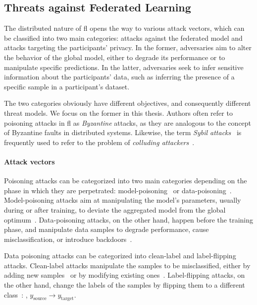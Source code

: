 \subsection{Threats against Federated Learning\label{sec:bg.fl.threats}}


The distributed nature of \gls{fl} opens the way to various attack vectors, which can be classified into two main categories: attacks against the federated model and attacks targeting the participants' privacy.
In the former, adversaries aim to alter the behavior of the global model, either to degrade its performance or to manipulate specific predictions.
In the latter, adversaries seek to infer sensitive information about the participants' data, such as inferring the presence of a specific sample in a participant's dataset.

The two categories obviously have different objectives, and consequently different threat models.
We focus on the former in this thesis.
Authors often refer to poisoning attacks in \gls{fl} as \emph{Byzantine} attacks, as they are analogous to the concept of Byzantine faults in distributed systems.
Likewise, the term \emph{Sybil attacks}~\cite{douceur_SybilAttack_2002} is frequently used to refer to the problem of \emph{colluding attackers}~\cite{fung_LimitationsFederatedLearning_2020}.

\paragraph{Attack vectors}

Poisoning attacks can be categorized into two main categories depending on the phase in which they are perpetrated: model-poisoning~\cite{bhagoji_AnalyzingFederatedLearning_2019} or data-poisoning~\cite{tolpegin_DataPoisoningAttacks_2020}.
Model-poisoning attacks aim at manipulating the model's parameters, usually during or after training, to deviate the aggregated model from the global optimum~\cite{fang_LocalModelPoisoning_2020}.
Data-poisoning attacks, on the other hand, happen before the training phase, and manipulate data samples to degrade performance, cause misclassification, or introduce backdoors~\cite{rodriguez-barroso_Surveyfederatedlearning_2023}.

Data poisoning attacks can be categorized into clean-label and label-flipping attacks.
Clean-label attacks manipulate the samples to be misclassified, either by adding new samples~\cite{zhang_Evaluationdatapoisoning_2022} or by modifying existing ones~\cite{merzouk_Parameterizingpoisoningattacks_2023}.
Label-flipping attacks, on the other hand, change the labels of the samples by flipping them to a different class~\cite{tolpegin_DataPoisoningAttacks_2020}: \ie, $y_{\text{source}} \rightarrow y_{\text{target}}$. 


